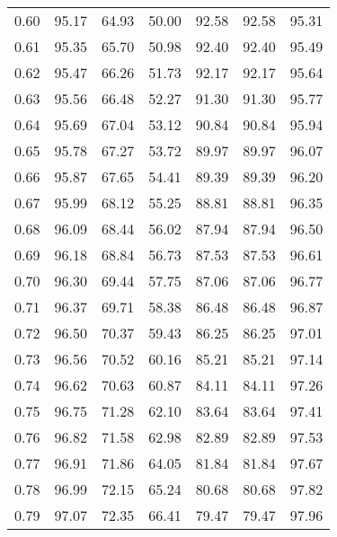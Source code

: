 \begin{tabular}{|c|c|c|c|c|c|c|}
      0.60 &     95.17 &     64.93 &      50.00 &   92.58 &      92.58 &         95.31 \\
      0.61 &     95.35 &     65.70 &      50.98 &   92.40 &      92.40 &         95.49 \\
      0.62 &     95.47 &     66.26 &      51.73 &   92.17 &      92.17 &         95.64 \\
      0.63 &     95.56 &     66.48 &      52.27 &   91.30 &      91.30 &         95.77 \\
      0.64 &     95.69 &     67.04 &      53.12 &   90.84 &      90.84 &         95.94 \\
      0.65 &     95.78 &     67.27 &      53.72 &   89.97 &      89.97 &         96.07 \\
      0.66 &     95.87 &     67.65 &      54.41 &   89.39 &      89.39 &         96.20 \\
      0.67 &     95.99 &     68.12 &      55.25 &   88.81 &      88.81 &         96.35 \\
      0.68 &     96.09 &     68.44 &      56.02 &   87.94 &      87.94 &         96.50 \\
      0.69 &     96.18 &     68.84 &      56.73 &   87.53 &      87.53 &         96.61 \\
      0.70 &     96.30 &     69.44 &      57.75 &   87.06 &      87.06 &         96.77 \\
      0.71 &     96.37 &     69.71 &      58.38 &   86.48 &      86.48 &         96.87 \\
      0.72 &     96.50 &     70.37 &      59.43 &   86.25 &      86.25 &         97.01 \\
      0.73 &     96.56 &     70.52 &      60.16 &   85.21 &      85.21 &         97.14 \\
      0.74 &     96.62 &     70.63 &      60.87 &   84.11 &      84.11 &         97.26 \\
      0.75 &     96.75 &     71.28 &      62.10 &   83.64 &      83.64 &         97.41 \\
      0.76 &     96.82 &     71.58 &      62.98 &   82.89 &      82.89 &         97.53 \\
      0.77 &     96.91 &     71.86 &      64.05 &   81.84 &      81.84 &         97.67 \\
      0.78 &     96.99 &     72.15 &      65.24 &   80.68 &      80.68 &         97.82 \\
      0.79 &     97.07 &     72.35 &      66.41 &   79.47 &      79.47 &         97.96 \\

\end{tabular}
